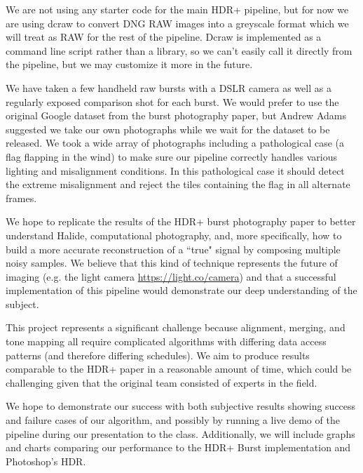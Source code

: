 \documentclass[12pt]{exam}
\newcommand{\sol}[1]{\leavevmode \begin{solution} #1 \end{solution}}
\begin{document}
\begin{questions}

    \sol{
    We are not using any starter code for the main HDR+ pipeline, but for now we are using dcraw to convert DNG RAW images into a greyscale format which we will treat as RAW for the rest of the pipeline. Dcraw is implemented as a command line script rather than a library, so we can't easily call it directly from the pipeline, but we may customize it more in the future.
    }


    \sol{
    We have taken a few handheld raw bursts with a DSLR camera as well as a regularly exposed comparison shot for each burst. We would prefer to use the original Google dataset from the burst photography paper, but Andrew Adams suggested we take our own photographs while we wait for the dataset to be released. We took a wide array of photographs including a pathological case (a flag flapping in the wind) to make sure our pipeline correctly handles various lighting and misalignment conditions. In this pathological case it should detect the extreme misalignment and reject the tiles containing the flag in all alternate frames.
    }


    \sol{
    We hope to replicate the results of the HDR+ burst photography paper to better understand Halide, computational photography, and, more specifically, how to build a more accurate reconstruction of a ``true" signal by composing multiple noisy samples. We believe that this kind of technique represents the future of imaging (e.g. the light camera \url{https://light.co/camera}) and that a successful implementation of this pipeline would demonstrate our deep understanding of the subject.

    This project represents a significant challenge because alignment, merging, and tone mapping all require complicated algorithms with differing data access patterns (and therefore differing schedules). We aim to produce results comparable to the HDR+ paper in a reasonable amount of time, which could be challenging given that the original team consisted of experts in the field.

    We hope to demonstrate our success with both subjective results showing success and failure cases of our algorithm, and possibly by running a live demo of the pipeline during our presentation to the class. Additionally, we will include graphs and charts comparing our performance to the HDR+ Burst implementation and Photoshop's HDR.
    }
    

\end{questions}
\end{document}

